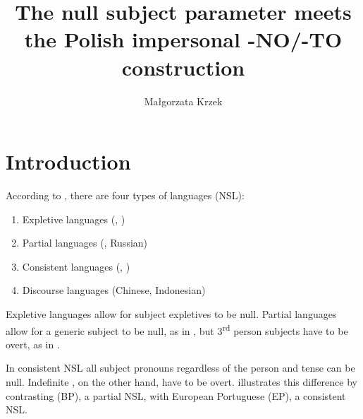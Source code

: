\documentclass[output=paper]{LSP/langsci}
\author{Małgorzata Krzek \affiliation{Newcastle University}
}
\title{The null subject parameter meets the Polish impersonal -NO/-TO construction}
\begin{document}
\section{Introduction}

According to \citet[12]{RobertsHolmberg2010}, there are four types of  languages (NSL):
\begin{enumerate}
\item Expletive  languages (, )
\item Partial  languages (, Russian)
\item Consistent  languages (, )
\item Discourse  languages  (Chinese, Indonesian)
\end{enumerate}

Expletive  languages allow for subject expletives to be null. Partial  languages allow for a generic subject to be null, as in , but 3\textsuperscript{rd} person subjects have to be overt, as in .

\z

\z

In consistent NSL all subject pronouns regardless of the person and tense can be null. Indefinite , on the other hand, have to be overt. \citet[92]{Holmberg2010Null} illustrates this difference by contrasting  (BP), a partial NSL, with European Portuguese (EP), a consistent NSL.

\z
\end{document}
